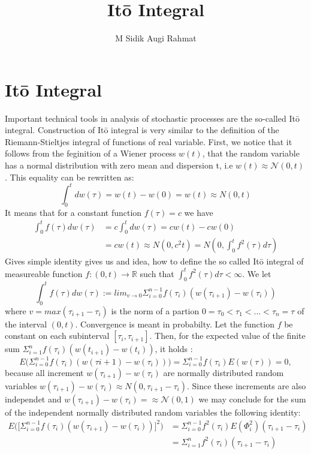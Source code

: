 \documentclass[a4paper]{article}
\title{It\={o} Integral}
\date{}
\author{M Sidik Augi Rahmat}
\begin{document}
\maketitle
\section{It\={o} Integral}
Important technical tools in analysis of stochastic processes are the so-called It\={o} integral. Construction of It\={o} integral is very similar to the definition of the Riemann-Stieltjes 
integral of functions of real variable. First, we notice that it follows from the feginition of a Wiener process $w(t)$, that the random variable has a normal distribution with
zero mean and dispersion t, i.e $w(t) \approx \mathcal{N}(0, t)$. This equality can be rewritten as:
\begin{equation}
    \int_0^t dw(\tau) = w(t) - w(0) = w(t) \approx N(0, t)
\end{equation}
It means that for a constant function $f(\tau) = c$ we have
\begin{align}
    \int_0^t f(\tau) dw(\tau) &= c \int_0^t dw(\tau) = cw(t) - cw(0)\\ \nonumber
                              &= cw(t) \approx N(0, c^2t) = N(0, \int_0^t f^2 (\tau) d\tau)
\end{align}
Gives simple identity gives us and idea, how to define the so called It\={o} integral of measureable function $f : (0, t) \rightarrow \mathbb{R}$ such that $ \int_0^t f^2(\tau)d\tau < \infty$.
We let 
\begin{equation}
    \int_0^t f(\tau) dw(\tau) := lim_{v\rightarrow 0} \Sigma_{i = 0}^{n-1}f(\tau_i)(w(\tau_{i+1}) - w(\tau_i))
\end{equation}
where $ v = max (\tau_{i+1} - \tau_i)$ is the norm of a partion $0 = \tau_0 < \tau_1 < ... < \tau_n = \tau$ of the interval $(0, t)$. Convergence is meant in probabilty.
Let the function $f$ be constant on each subinterval $[\tau_i, \tau_{i+1}]$. Then, for the expected value of the finite sum $\Sigma_{i= 1}^n f(\tau_i) (w(t_{i+1}) - 
w(t_i))$, it holds :
\begin{equation}
    E\bigg( \Sigma_{i=0}^{n-1} f(\tau_i)(w(\tau{i+1}) - w(\tau_i))\bigg) = \Sigma_{i=0}^{n-1}f(\tau_i)E(w(\tau)) = 0,
\end{equation}
because all increment $w(\tau_{i+1}) - w(\tau_i)$ are normally distributed random variables $w(\tau_{i+1}) - w(\tau_i) \approx N(0, \tau_{i+1} - \tau_{i})$. Since
these increments are also independet and $w(\tau_{i+1}) - w(\tau_i) = \approx \mathcal{N}(0, 1)$ we may conclude for the sum of the independent normally distributed random variables
the following identity:
\begin{align}
    E\bigg(\bigg[ \Sigma_{i=0}^{n-1} f(\tau_i) (w(\tau_{i+1}) - w(\tau_i))\bigg]^2 \bigg) &= \Sigma_{i=0}^{n-1} f^2(\tau_i) E(\Phi_i^{2})(\tau_{i+1}-\tau_i)\\
    &= \Sigma_{i=1}^{n}f^2(\tau_i)(\tau_{i+1}-\tau_{i})
\end{align}
\end{document}
